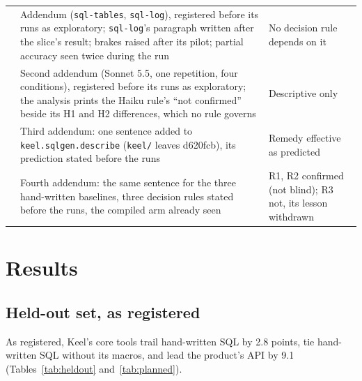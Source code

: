 \documentclass[sigconf, nonacm]{acmart}
\newcommand{\code}[1]{\texttt{#1}}
\begin{document}
\begin{table}[t]
\begin{tabularx}{\textwidth}{P{0.75in} L L}
 & Addendum (\code{sql-tables}, \code{sql-log}), registered before its runs as exploratory; \code{sql-log}'s paragraph written after the slice's result; brakes raised after its pilot; partial accuracy seen twice during the run & No decision rule depends on it \\
 & Second addendum (Sonnet 5.5, one repetition, four conditions), registered before its runs as exploratory; the analysis prints the Haiku rule's ``not confirmed'' beside its H1 and H2 differences, which no rule governs & Descriptive only \\
 & Third addendum: one sentence added to \code{keel.sqlgen.describe} (\code{keel/} leaves d620fcb), its prediction stated before the runs & Remedy effective as predicted \\
 & Fourth addendum: the same sentence for the three hand-written baselines, three decision rules stated before the runs, the compiled arm already seen & R1, R2 confirmed (not blind); R3 not, its lesson withdrawn \\
\bottomrule
\end{tabularx}
\end{table}

\section{Results}
\label{sec:results}

\subsection{Held-out set, as registered}
\label{sec:heldout}

As registered, Keel's core tools trail hand-written SQL by 2.8 points, tie hand-written SQL without its macros, and lead the product's API by 9.1 (Tables~\ref{tab:heldout} and~\ref{tab:planned}).
\end{document}

